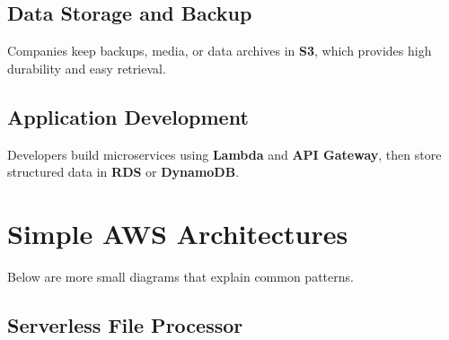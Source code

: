 \documentclass[12pt]{article}
\begin{document}
\subsection{Data Storage and Backup}
Companies keep backups, media, or data archives in \textbf{S3}, which provides high durability and easy retrieval.

\subsection{Application Development}
Developers build microservices using \textbf{Lambda} and \textbf{API Gateway}, then store structured data in \textbf{RDS} or \textbf{DynamoDB}.

\clearpage

\section{Simple AWS Architectures}
\justifying

Below are more small diagrams that explain common patterns.

\subsection{Serverless File Processor}
\begin{center}
\end{center}
\end{document}
